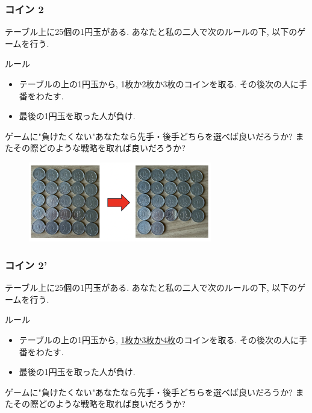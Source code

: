 \documentclass[11pt,dvipdfmx]{beamer}
\theoremstyle{definition}
\theoremstyle{remark}
\begin{document}
\begin{frame}
\frametitle{コイン 2}
テーブル上に25個の1円玉がある.
あなたと私の二人で次のルールの下, 以下のゲームを行う.

 \begin{block}{ルール}
\begin{itemize}
\item テーブルの上の1円玉から, 1枚か2枚か3枚のコインを取る. その後次の人に手番をわたす. 
\item 最後の1円玉を取った人が負け.
\end{itemize}
   \end{block}

ゲームに"負けたくない"あなたなら先手・後手どちらを選べば良いだろうか?
またその際どのような戦略を取れば良いだろうか?

\begin{figure}[htbp]
\begin{center}
\includegraphics[width=80mm]{coin2.png}
\end{center}
\end{figure}

\end{frame}

\begin{frame}
\frametitle{コイン 2'}
テーブル上に25個の1円玉がある.
あなたと私の二人で次のルールの下, 以下のゲームを行う.

 \begin{block}{ルール}
\begin{itemize}
\item テーブルの上の1円玉から, \underline{1枚か3枚か4枚}のコインを取る. その後次の人に手番をわたす.
\item 最後の1円玉を取った人が負け.
\end{itemize}
   \end{block}

ゲームに"負けたくない"あなたなら先手・後手どちらを選べば良いだろうか?
またその際どのような戦略を取れば良いだろうか?


\end{frame}
\end{document}
